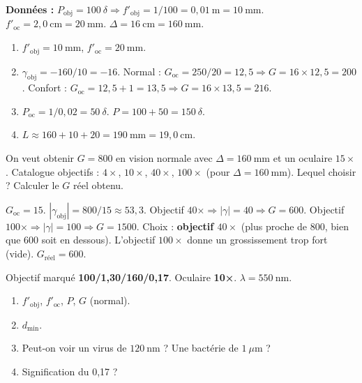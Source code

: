 \documentclass[11pt]{article}
\begin{document}
\begin{corrige}[Exercice 1]
\textbf{Données :} $P_{\text{obj}} = 100\ \delta \Rightarrow f'_{\text{obj}} = 1/100 = 0,01\ \text{m} = 10\ \text{mm}$.
$f'_{\text{oc}} = 2,0\ \text{cm} = 20\ \text{mm}$.
$\Delta = 16\ \text{cm} = 160\ \text{mm}$.
\begin{enumerate}
    \item $f'_{\text{obj}} = 10\ \text{mm}$, $f'_{\text{oc}} = 20\ \text{mm}$.
    \item $\gamma_{\text{obj}} = -160/10 = -16$.
    Normal : $G_{\text{oc}} = 250/20 = 12,5 \Rightarrow G = 16 \times 12,5 = \boxed{200}$.
    Confort : $G_{\text{oc}} = 12,5 + 1 = 13,5 \Rightarrow G = 16 \times 13,5 = \boxed{216}$.
    \item $P_{\text{oc}} = 1/0,02 = 50\ \delta$. $P = 100 + 50 = \boxed{150\ \delta}$.
    \item $L \approx 160 + 10 + 20 = 190\ \text{mm} = \boxed{19,0\ \text{cm}}$.
\end{enumerate}
\end{corrige}

\begin{exercice}
On veut obtenir $G = 800$ en vision normale avec $\Delta = 160\ \text{mm}$ et un oculaire $15\times$. Catalogue objectifs : $4\times$, $10\times$, $40\times$, $100\times$ (pour $\Delta=160\ \text{mm}$). Lequel choisir ? Calculer le $G$ réel obtenu.
\end{exercice}

\begin{corrige}[Exercice 2]
$G_{\text{oc}} = 15$. $|\gamma_{\text{obj}}| = 800/15 \approx 53,3$.
Objectif $40\times \Rightarrow |\gamma|=40 \Rightarrow G=600$.
Objectif $100\times \Rightarrow |\gamma|=100 \Rightarrow G=1500$.
Choix : \textbf{objectif $40\times$} (plus proche de 800, bien que 600 soit en dessous). L'objectif $100\times$ donne un grossissement trop fort (vide).
$G_{\text{réel}} = \boxed{600}$.
\end{corrige}

\begin{exercice}
Objectif marqué \textbf{100/1,30/160/0,17}. Oculaire \textbf{10×}. $\lambda = 550\ \text{nm}$.
\begin{enumerate}
    \item $f'_{\text{obj}}$, $f'_{\text{oc}}$, $P$, $G$ (normal).
    \item $d_{\text{min}}$.
    \item Peut-on voir un virus de $120\ \text{nm}$ ? Une bactérie de $1\ \mu\text{m}$ ?
    \item Signification du 0,17 ?
\end{enumerate}
\end{exercice}
\end{document}
